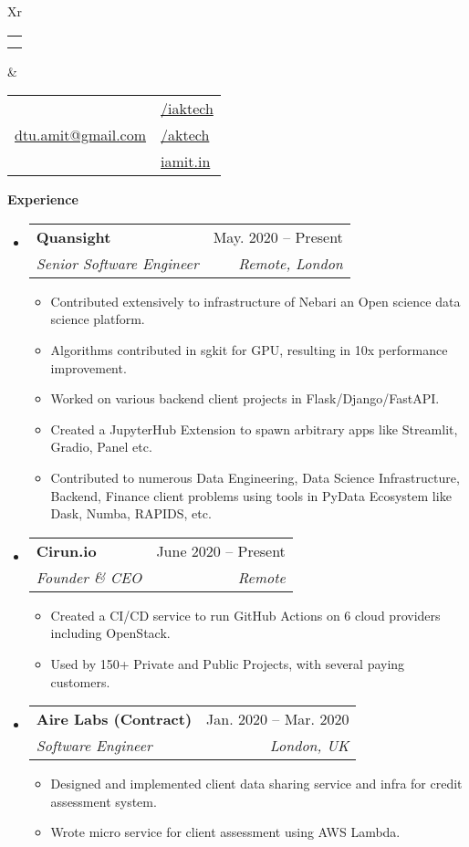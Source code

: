 \documentclass[letterpaper,12pt]{article}[leftmargin=*]
\makeatletter
\def \fullname {Amit Kumar}
\def \subtitle {}
\def \linkedinicon {\faLinkedin}
\def \linkedinlink {https://linkedin.com/in/iaktech/}
\def \linkedintext {/iaktech}
\def \phoneicon {\faPhone}
\def \phonetext {+44-7904-296-365}
\def \emailicon {\faEnvelope}
\def \emaillink {mailto:dtu.amit@gmail.com}
\def \emailtext {dtu.amit@gmail.com}
\def \githubicon {\faGithub}
\def \githublink {https://github.com/aktech}
\def \githubtext {/aktech}
\def \websiteicon {\faGlobe}
\def \websitelink {https://iamit.in/}
\def \websitetext {iamit.in}
\def \headertype {\doublecol} %
\def \entryspacing {-0pt}
\def \linkedin {\linkedinicon \hspace{3pt}\href{\linkedinlink}{\linkedintext}}
\def \phone {\phoneicon \hspace{3pt}{ \phonetext}}
\def \email {\emailicon \hspace{3pt}\href{\emaillink}{\emailtext}}
\def \github {\githubicon \hspace{3pt}\href{\githublink}{\githubtext}}
\def \website {\websiteicon \hspace{3pt}\href{\websitelink}{\websitetext}}
\renewcommand{\section}[2]{\vspace{5pt}
  \colorbox{secondary}{\color{white}\raggedbottom\normalsize\textbf{{#1}{\hspace{7pt}#2}}}
}
\newcommand{\resumeEntryStart}{\begin{itemize}[leftmargin=2.5mm]}
\newcommand{\resumeEntryEnd}{\end{itemize}\vspace{\entryspacing}}
\newcommand{\resumeItemListStart}{\begin{itemize}[leftmargin=4.5mm]}
\newcommand{\resumeItemListEnd}{\end{itemize}}
\newcommand{\resumeItem}[1]{
  \item\small{
    {#1 \vspace{-2pt}}
  }
}
\newcommand{\resumeEntryTSDL}[4]{
  \vspace{-1pt}\item[]
    \begin{tabularx}{0.97\textwidth}{X@{\hspace{60pt}}r}
      \textbf{\color{primary}#1} & {\firabook\color{accent}\small#2} \\
      \textit{\color{accent}\small#3} & \textit{\color{accent}\small#4} \\
    \end{tabularx}\vspace{-6pt}
}
\newcommand{\doublecol}[6]{
  \begin{tabularx}{\textwidth}{Xr}
    {
      \begin{tabular}[c]{l}
        \fontsize{35}{45}\selectfont{\color{primary}{{\textbf{\fullname}}}} \\
        {\textit{\subtitle}} %
      \end{tabular}
    } & {
      \begin{tabular}[c]{l@{\hspace{1.5em}}l}
        {\small#4} & {\small#1} \\
        {\small#5} & {\small#2} \\
        {\small#6} & {\small#3}
      \end{tabular}
    }
  \end{tabularx}
}
\newcommand{\singlecol}[6]{
  \begin{tabularx}{\textwidth}{Xr}
    {
      \begin{tabular}[b]{l}
        \fontsize{35}{45}\selectfont{\color{primary}{{\textbf{\fullname}}}} \\
        {\textit{\subtitle}} %
      \end{tabular}
    } & {
      \begin{tabular}[c]{l}
        {\small#1} \\
        {\small#2} \\
        {\small#3} \\
        {\small#4} \\
        {\small#5} \\
        {\small#6}
      \end{tabular}
    }
  \end{tabularx}
}
\makeatother
\begin{document}


\headertype{\linkedin}{\github}{\website}{\phone}{\email}{} %
\vspace{-10pt} %

\section{\faPieChart}{Experience}

  \resumeEntryStart
    \resumeEntryTSDL
      {Quansight}{May. 2020 -- Present}
      {Senior Software Engineer}{Remote, London}
    \resumeItemListStart
      \resumeItem {Contributed extensively to infrastructure of Nebari an Open science data science platform.}
      \resumeItem{Algorithms contributed in sgkit for GPU, resulting in 10x performance improvement.}
      \resumeItem {Worked on various backend client projects in Flask/Django/FastAPI.}
      \resumeItem {Created a JupyterHub Extension to spawn arbitrary apps like Streamlit, Gradio, Panel etc.}
      \resumeItem{Contributed to numerous Data Engineering, Data Science Infrastructure, Backend, Finance client problems using tools in PyData Ecosystem like Dask, Numba, RAPIDS, etc.}
    \resumeItemListEnd
  \resumeEntryEnd

  \resumeEntryStart
    \resumeEntryTSDL
      {Cirun.io}{June 2020 -- Present}
      {Founder \& CEO}{Remote}
    \resumeItemListStart
        \resumeItem {Created a CI/CD service to run GitHub Actions on 6 cloud providers including OpenStack.}
        \resumeItem{Used by 150+ Private and Public Projects, with several paying customers.}
    \resumeItemListEnd
  \resumeEntryEnd

  \resumeEntryStart
    \resumeEntryTSDL
      {Aire Labs (Contract)}{Jan. 2020 -- Mar. 2020}
      {Software Engineer}{London, UK}
    \resumeItemListStart
      \resumeItem {Designed and implemented client data sharing service and infra for credit assessment system.}
      \resumeItem{Wrote micro service for client assessment using AWS Lambda.}
    \resumeItemListEnd
  \resumeEntryEnd
\end{document}
